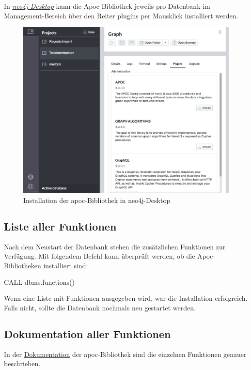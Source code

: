 \documentclass[ngerman,]{scrreprt}
\begin{document}
In \href{https://neo4j.com/download/}{\emph{neo4j-Desktop}} kann die Apoc-Bibliothek jeweils pro Datenbank im Management-Bereich über den Reiter plugins per Mausklick installiert werden.

\begin{figure}
\centering
\includegraphics{Bilder/cypherFortgeschrittene/neo4j-Desktop-install-apoc.png}
\caption{Installation der apoc-Bibliothek in neo4j-Desktop}
\end{figure}

\subsection{Liste aller Funktionen}\label{liste-aller-funktionen}

Nach dem Neustart der Datenbank stehen die zusätzlichen Funktionen zur Verfügung. Mit folgendem Befehl kann überprüft werden, ob die Apoc-Bibliotheken installiert sind:

CALL dbms.functions()

Wenn eine Liste mit Funktionen ausgegeben wird, war die Installation erfolgreich. Falls nicht, sollte die Datenbank nochmals neu gestartet werden.

\subsection{Dokumentation aller Funktionen}\label{dokumentation-aller-funktionen}

In der \href{https://neo4j-contrib.github.io/neo4j-apoc-procedures/}{Dokumentation} der apoc-Bibliothek sind die einzelnen Funktionen genauer beschrieben.
\end{document}
